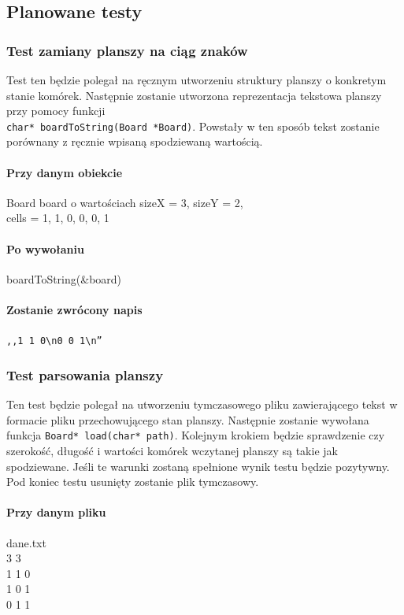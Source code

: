 \documentclass{article}
\begin{document}
\subsection{Planowane testy}

\subsubsection{Test zamiany planszy na ciąg znaków} 
Test ten będzie polegał na ręcznym utworzeniu struktury planszy o konkretym stanie komórek. Następnie zostanie utworzona reprezentacja tekstowa planszy przy pomocy funkcji \\ \texttt{char* boardToString(Board *Board)}. Powstały w ten sposób tekst zostanie porównany z ręcznie wpisaną spodziewaną wartością.

\paragraph{Przy danym obiekcie} Board board o wartościach sizeX = 3, sizeY = 2, \\ cells = {1, 1, 0, 0, 0, 1 }
\paragraph{Po wywołaniu} boardToString(\&board)
\paragraph{Zostanie zwrócony napis} \texttt{,,1 1 0\textbackslash{}n0 0 1\textbackslash{}n''}


\subsubsection{Test parsowania planszy}
Ten test będzie polegał na utworzeniu tymczasowego pliku zawierającego tekst w formacie pliku przechowującego stan planszy. Następnie zostanie wywołana funkcja \texttt{Board* load(char* path)}. Kolejnym krokiem będzie sprawdzenie czy szerokość, długość i wartości komórek wczytanej planszy są takie jak spodziewane. Jeśli te warunki zostaną spełnione wynik testu będzie pozytywny. Pod koniec testu usunięty zostanie plik tymczasowy.

\paragraph{Przy danym pliku} dane.txt \\
3 3\\
1 1 0\\
1 0 1\\
0 1 1\\
\end{document}
